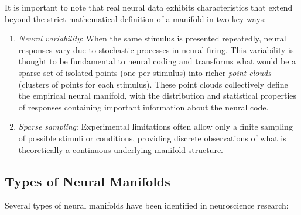 \documentclass[11pt,a4paper]{article}
\begin{document}
It is important to note that real neural data exhibits characteristics that extend beyond the strict mathematical definition of a manifold in two key ways:

\begin{enumerate}
    \item \textit{Neural variability}: When the same stimulus is presented repeatedly, neural responses vary due to stochastic processes in neural firing. This variability is thought to be fundamental to neural coding and transforms what would be a sparse set of isolated points (one per stimulus) into richer \textit{point clouds} (clusters of points for each stimulus). These point clouds collectively define the empirical neural manifold, with the distribution and statistical properties of responses containing important information about the neural code.
    
    \item \textit{Sparse sampling}: Experimental limitations often allow only a finite sampling of possible stimuli or conditions, providing discrete observations of what is theoretically a continuous underlying manifold structure.
\end{enumerate}

\subsection{Types of Neural Manifolds}

Several types of neural manifolds have been identified in neuroscience research:
\end{document}
